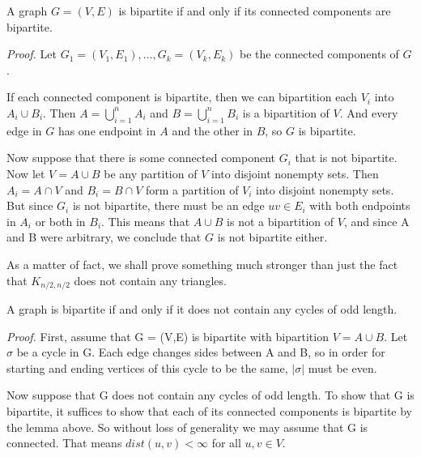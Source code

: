 \documentclass{tufte-handout}
\begin{document}
\begin{Lemma}
    A graph \( G = (V,E) \) is bipartite if and only if its connected components are bipartite.
\end{Lemma}

\textit{Proof.} Let \(G_1 = (V_1,E_1), \ldots, G_k = (V_k,E_k) \) be the connected components of \( G \).

If each connected component is bipartite, then we can bipartition each \( V_i \) into \( A_i \cup B_i \).
Then \( A = \bigcup_{i=1}^{n} A_i \) and \( B = \bigcup_{i=1}^{n} B_i \) is a bipartition of \( V \).
And every edge in \( G \) has one endpoint in \( A \) and the other in \( B \), so \( G \) is bipartite.

Now suppose that there is some connected component \( G_i \) that is not bipartite. Now let
\(V = A\cup B \) be any partition of \( V \) into disjoint nonempty sets. Then \(A_i=A\cap V\) and
\(B_i = B\cap V\)  form a partition of \( V_i \) into disjoint nonempty sets. But since \( G_i \) is not bipartite,
there must be an edge \( uv \in E_i \) with both endpoints in \( A_i \) or both in \( B_i \).
This means that \( A \cup B \) is not a bipartition of \( V \), and since A and B were arbitrary, we conclude that
\( G \) is not bipartite either. \qedsymbol

As a matter of fact, we shall prove something much stronger than just the fact that \( K_{n/2,n/2} \)
does not contain any triangles. 
\begin{Theorem}
    A graph is bipartite if and only if it does not contain any cycles of odd length.
\end{Theorem}
\textit{Proof.} First, assume that G = (V,E) is bipartite with bipartition \( V = A \cup B \).
Let \(\sigma\) be a cycle in G. Each edge changes sides between A and B, so in order
for starting and ending vertices of this cycle to be the same, \(\left|\sigma\right|\)
must be even.

Now suppose that G does not contain any cycles of odd length. To show that G is bipartite,
it suffices to show that each of its connected components is bipartite by the lemma above.
So without loss of generality we may assume that G is connected.
That means \(dist(u,v) < \infty\) for all \(u,v \in V\).
\end{document}
